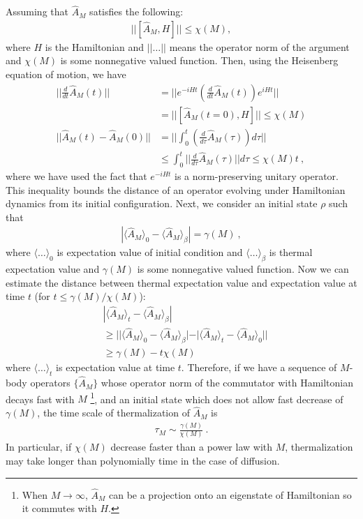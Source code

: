 \documentclass[twocolumn,superscriptaddress, prb]{revtex4-1}
\begin{document}
Assuming that $\hat{A}_M$ satisfies the following:
\begin{align}
||[\hat{A}_M, H]|| \leq \chi(M),
\end{align}
where $H$ is the Hamiltonian and $||\ldots||$ means the operator norm of the argument and $\chi(M)$ is some nonnegative valued function.
Then, using the Heisenberg equation of motion, we have
\begin{align}
\bigg|\bigg|\frac{d}{dt} \hat{A}_M(t)\bigg|\bigg| &= \bigg|\bigg| e^{-i H t} \left(\frac{d}{dt} \hat{A}_M (t)\right) e^{i H t} \bigg|\bigg| \nonumber\\
&= ||[\hat{A}_M(t = 0), H]|| \leq \chi(M) \\
||\hat{A}_M(t) - \hat{A}_M(0)|| &= \bigg|\bigg|\int_0^t \left(\frac{d}{d\tau} \hat{A}_M(\tau)\right)d\tau \bigg|\bigg| \nonumber\\
&\leq \int^t_0 \big|\big|\frac{d}{d\tau} \hat{A}_M(\tau)\big|\big|d\tau \leq \chi(M) t ~,
\end{align}
where we have used the fact that $e^{-iHt}$ is a norm-preserving unitary operator.
This inequality bounds the distance of an operator evolving under Hamiltonian dynamics
from its initial configuration. Next, we consider an initial state $\rho$ such that
\begin{align}
|\langle \hat{A}_M \rangle_0 - \langle \hat{A}_M \rangle_\beta| = \gamma(M) ~,
\end{align}
where $\langle \ldots \rangle_0$ is expectation value of initial condition and $\langle \ldots \rangle_\beta$
is thermal expectation value and $\gamma(M)$ is some nonnegative valued function.
Now we can estimate the distance between thermal expectation value and expectation value at time $t$ (for $t \leq \gamma(M)/\chi(M)$):
\begin{align}
&|\langle \hat{A}_M \rangle_t - \langle \hat{A}_M \rangle_\beta| \nonumber\\
&\geq ||\langle \hat{A}_M\rangle_0 - \langle \hat{A}_M\rangle_\beta | -|\langle \hat{A}_M\rangle_t - \langle \hat{A}_M\rangle_0 || \nonumber\\
&\geq \gamma(M) - t \chi(M)
\end{align}
where $\langle \ldots \rangle_t$ is expectation value at time $t$.
Therefore, if we have a sequence of $M$-body operators $\{ \hat{A}_M \}$
whose operator norm of the commutator with Hamiltonian decays fast with $M$
\footnote{When $M\rightarrow\infty$, $\hat{A}_M$ can be a projection onto an eigenstate of Hamiltonian so it commutes with $H$.},
and an initial state which does not allow fast decrease of $\gamma(M)$,
the time scale of thermalization of $\hat{A}_M$ is
\begin{align}
\tau_M \sim \frac{\gamma(M)}{\chi(M)} ~.
\end{align}
In particular, if $\chi(M)$ decrease faster than a power law with $M$,
thermalization may take longer than polynomially time in the case of diffusion.
\end{document}
